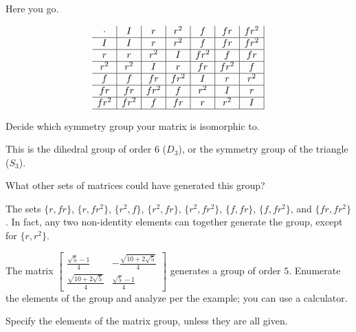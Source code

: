 \documentclass[../key.tex]{subfiles}
\begin{document}
Here you go.

$$\begin{array}{c|c|c|c|c|c|c|}
\cdot & I & r & r^2 & f & fr & fr^2 \\ \hline
I & I & r & r^2 & f & fr & fr^2 \\ \hline
r & r & r^2 & I & fr^2 & f & fr \\ \hline
r^2 & r^2 & I & r & fr & fr^2 & f \\ \hline
f & f & fr & fr^2 & I & r & r^2 \\ \hline
fr & fr & fr^2 & f & r^2 & I & r \\ \hline
fr^2 & fr^2 & f & fr & r & r^2 & I \\ \hline
\end{array}$$

\begin{iinner_problem}
\item Decide which symmetry group your matrix is isomorphic to.
\end{iinner_problem}

This is the dihedral group of order $6$ ($D_3$), or the symmetry group of the triangle ($S_3$).

\begin{iinner_problem}
\item What other sets of matrices could have generated this group?
\end{iinner_problem}

The sets $\{r, fr\}$, $\{r, fr^2\}$, $\{r^2, f\}$, $\{r^2, fr\}$, $\{r^2, fr^2\}$, $\{f,fr\}$, $\{f,fr^2\}$, and $\{fr,fr^2\}$. In fact, any two non-identity elements can together generate the group, except for $\{r, r^2\}$.

\begin{outer_problem}
\item The matrix $\left[\begin{array}{cc} \frac{\sqrt{5}-1}{4} & -\frac{\sqrt{10+2\sqrt{5}}}{4} \\ \frac{\sqrt{10+2\sqrt{5}}}{4} & \frac{\sqrt{5}-1}{4} \end{array}\right]$ generates a group of order $5$. Enumerate the elements of the group and analyze per the example; you can use a calculator.
\end{outer_problem}

\begin{iinner_problem}[start=1]
\item Specify the elements of the matrix group, unless they are all given.
\end{iinner_problem}
\end{document}

